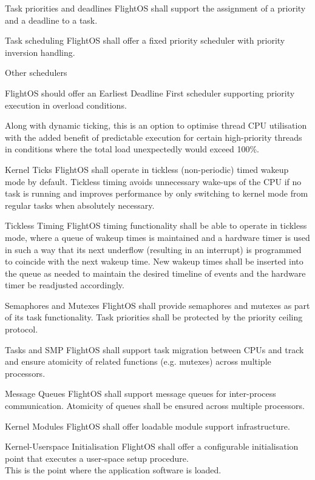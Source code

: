  {Task priorities and deadlines}{%
FlightOS shall support the assignment of a priority and a deadline to a task.
}{}%

 {Task scheduling}{%
FlightOS shall offer a fixed priority scheduler with priority inversion handling.
}{}%

 {Other schedulers}{%
FlightOS should offer an Earliest Deadline First scheduler supporting priority
execution in overload conditions.

}{%
Along with dynamic ticking, this is an option to optimise thread CPU utilisation
with the added benefit of predictable execution for certain high-priority
threads in conditions where the total load unexpectedly would exceed 100\%.
}%

 {Kernel Ticks}{%
FlightOS shall operate in tickless (non-periodic) timed wakeup mode by default.
}{%
Tickless timing avoids unnecessary wake-ups of the CPU if no task is running
and improves performance by only switching to kernel mode from regular tasks
when absolutely necessary.
}%

 {Tickless Timing}{%
FlightOS timing functionality shall be able to operate in tickless mode, where 
a queue of wakeup times is maintained and a hardware timer is used in such a way
that its next underflow (resulting in an interrupt) is programmed to coincide
with the next wakeup time. New wakeup times shall be inserted into the queue as
needed to maintain the desired timeline of events and the hardware timer
be readjusted accordingly.
}{}%

 {Semaphores and Mutexes}{%
FlightOS shall provide semaphores and mutexes as part of its task functionality.
Task priorities shall be protected by the priority ceiling protocol.
}{}%

 {Tasks and \gls{SMP}}{%
FlightOS shall support task migration between \glspl{CPU} and track and ensure
atomicity of related functions (e.g. mutexes) across multiple processors.
}{}%

 {Message Queues}{%
FlightOS shall support message queues for inter-process communication.
Atomicity of queues shall be ensured across multiple processors.
}{}%

 {Kernel Modules}{%
FlightOS shall offer loadable module support infrastructure.
}{}%

 {Kernel-Userspace Initialisation}{%
FlightOS shall offer a configurable initialisation point that executes a
user-space setup procedure.\\


}{%
This is the point where the application software is loaded.%
}%

